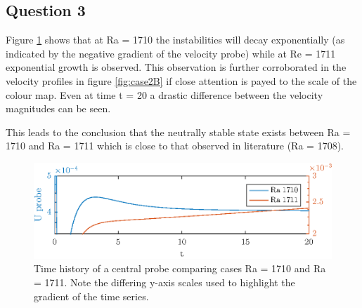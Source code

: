 \documentclass[10pt,a4paper]{article}
\begin{document}
\subsection{Question 3}

Figure \ref{fig:timeseries2} shows that at Ra = 1710 the instabilities will decay exponentially (as indicated by the negative gradient of the velocity probe) while at Re = 1711 exponential growth is observed. This observation is further corroborated in the velocity profiles in figure \ref{fig:case2B} if close attention is payed to the scale of the colour map. Even at time t = 20 a drastic difference between the velocity magnitudes can be seen. 

This leads to the conclusion that the neutrally stable state exists between Ra = 1710 and Ra = 1711 which is close to that observed in literature (Ra = 1708).


\begin{figure}[H]
\centering
\includegraphics[width=\linewidth]{Probe_history2.eps}
\caption{Time history of a central probe comparing cases Ra = 1710 and Ra = 1711. Note the differing y-axis scales used to highlight the gradient of the time series.}
\label{fig:timeseries2}
\end{figure}
\end{document}
